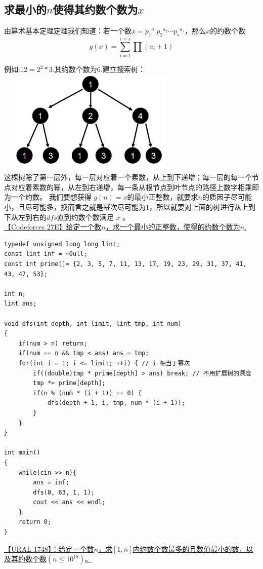 \subsection{求最小的$n$使得其约数个数为$x$}
由算术基本定理定理我们知道：若一个数$x={p_1}^{a_1}{p_2}^{a_2}⋯{p_s}^{a_s}$，那么$x$的约数个数 \\
$$g(x)=\sum_{i=1}^{i=s}\prod (a_i+1)$$

例如:$12=2^2*3$,其约数个数为$6$.建立搜索树：\\
\includegraphics[height = 5cm,width = 9cm]{anti_prime.jpg}\\
这棵树除了第一层外，每一层对应着一个素数，从上到下递增；每一层的每一个节点对应着素数的幂，从左到右递增，每一条从根节点到叶节点的路径上数字相乘即为一个约数。 我们要想获得 $g(n)=x $的最小正整数，就要求$n$的质因子尽可能小，且尽可能多，换而言之就是幂次尽可能为$1$，所以就要对上面的树进行从上到下从左到右的$dfs$直到约数个数满足 $x$ 。 \\

\underline {【Codeforces 27E】给定一个数$n$，求一个最小的正整数，使得的约数个数为$n$.}

\begin{lstlisting}
typedef unsigned long long lint;
const lint inf = ~0ull;
const int prime[]= {2, 3, 5, 7, 11, 13, 17, 19, 23, 29, 31, 37, 41, 43, 47, 53};

int n;
lint ans;

void dfs(int depth, int limit, lint tmp, int num)
{
	if(num > n) return;
	if(num == n && tmp < ans) ans = tmp;
	for(int i = 1; i <= limit; ++i) { // i 相当于幂次
		if((double)tmp * prime[depth] > ans) break; // 不用扩展树的深度
		tmp *= prime[depth];
		if(n % (num * (i + 1)) == 0) {
			dfs(depth + 1, i, tmp, num * (i + 1));
		}
	}
}

int main()
{
	while(cin >> n){
		ans = inf;
		dfs(0, 63, 1, 1);
		cout << ans << endl;
	}
	return 0;
}
\end{lstlisting}

\underline {【URAL 1748】：给定一个数$n$，求$[1,n]$内约数个数最多的且数值最小的数，以及其约数个数$(n\leq 10^{18})$。}


